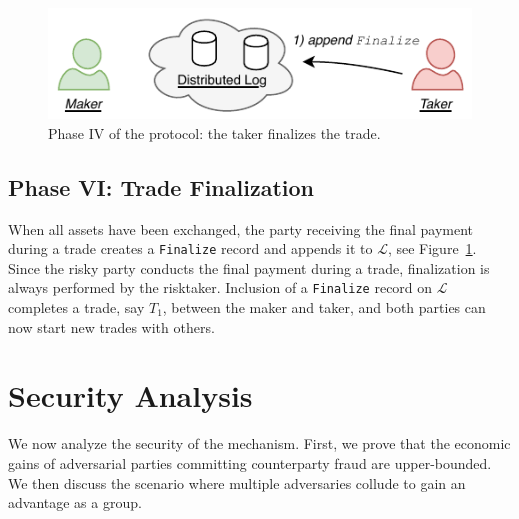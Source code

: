 \begin{figure}[h]
	\centering
	\includegraphics[width=0.7\linewidth]{xchange/assets/xchange_protocol_4}
	\caption{Phase IV of the \ModelName{} protocol: the taker finalizes the trade.}
	\label{fig:matching_protocol_4}
\end{figure}

\subsection*{Phase VI: Trade Finalization}
\label{sec:phase_finalization}
When all assets have been exchanged, the party receiving the final payment during a trade creates a \texttt{Finalize} record and appends it to $ \mathcal{L} $, see Figure~\ref{fig:matching_protocol_4}.
Since the risky party conducts the final payment during a trade, finalization is always performed by the risktaker.
Inclusion of a \texttt{Finalize} record on $ \mathcal{L} $ completes a trade, say $ T_1 $, between the maker and taker, and both parties can now start new trades with others.

\section{Security Analysis}
\label{sec:analysis}
We now analyze the security of the \ModelName{} mechanism.
First, we prove that the economic gains of adversarial parties committing counterparty fraud are upper-bounded.
We then discuss the scenario where multiple adversaries collude to gain an advantage as a group.

